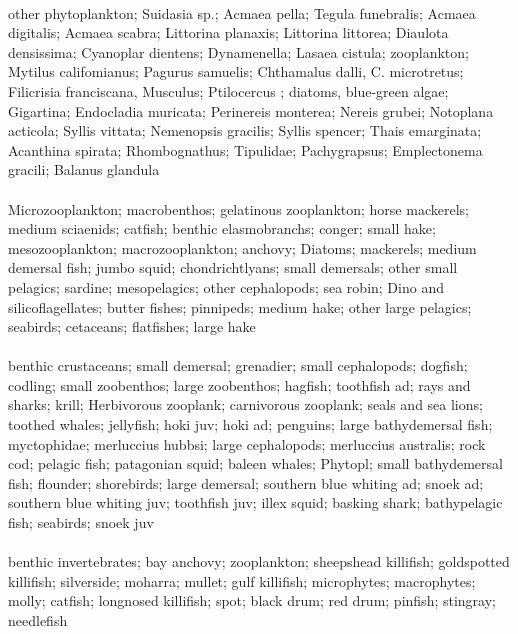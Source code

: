 \fullhline
\hline
{} \\
\hline
other phytoplankton; Suidasia sp.; Acmaea pella; Tegula funebralis; Acmaea digitalis; Acmaea scabra; Littorina planaxis; Littorina littorea; Diaulota densissima; Cyanoplar dientens; Dynamenella; Lasaea cistula; zooplankton; Mytilus califomianus; Pagurus samuelis; Chthamalus dalli, C. microtretus; Filicrisia franciscana, Musculus; Ptilocercus ; diatoms, blue-green algae; Gigartina; Endocladia muricata; Perinereis monterea; Nereis grubei; Notoplana acticola; Syllis vittata; Nemenopsis gracilis; Syllis spencer; Thais emarginata; Acanthina spirata; Rhombognathus; Tipulidae; Pachygrapsus; Emplectonema gracili; Balanus glandula\\
\fullhline
\hline
{} \\
\hline
Microzooplankton; macrobenthos; gelatinous zooplankton; horse mackerels; medium sciaenids; catfish; benthic elasmobranchs; conger; small hake; mesozooplankton; macrozooplankton; anchovy; Diatoms; mackerels; medium demersal fish; jumbo squid; chondrichtlyans; small demersals; other small pelagics; sardine; mesopelagics; other cephalopods; sea robin; Dino and silicoflagellates; butter fishes; pinnipeds; medium hake; other large pelagics; seabirds; cetaceans; flatfishes; large hake\\
\fullhline
\hline
{} \\
\hline
benthic crustaceans; small demersal; grenadier; small cephalopods; dogfish; codling; small zoobenthos; large zoobenthos; hagfish; toothfish ad; rays and sharks; krill; Herbivorous zooplank; carnivorous zooplank; seals and sea lions; toothed whales; jellyfish; hoki juv; hoki ad; penguins; large bathydemersal fish; myctophidae; merluccius hubbsi; large cephalopods; merluccius australis; rock cod; pelagic fish; patagonian squid; baleen whales; Phytopl; small bathydemersal fish; flounder; shorebirds; large demersal; southern blue whiting ad; snoek ad; southern blue whiting juv; toothfish juv; illex squid; basking shark; bathypelagic fish; seabirds; snoek juv\\
\fullhline
\hline
{} \\
\hline
benthic invertebrates; bay anchovy; zooplankton; sheepshead killifish; goldspotted killifish; silverside; moharra; mullet; gulf killifish; microphytes; macrophytes; molly; catfish; longnosed killifish; spot; black drum; red drum; pinfish; stingray; needlefish\\
